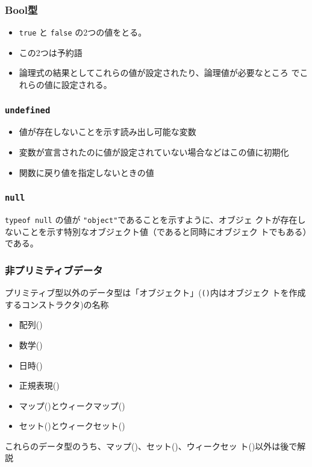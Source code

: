 \begin{frame}[containsverbatim]
 \frametitle{Bool型}
 \begin{itemize}
  \item \Verb+true+ と \Verb+false+ の2つの値をとる。
  \item この2つは予約語
  \item 論理式の結果としてこれらの値が設定されたり、論理値が必要なところ
        でこれらの値に設定される。
 \end{itemize}
\end{frame}
\begin{frame}[containsverbatim]
 \frametitle{\texttt{undefined}}
 \begin{itemize}
  \item 値が存在しないことを示す読み出し可能な変数
  \item 変数が宣言されたのに値が設定されていない場合などはこの値に初期化
  \item 関数に戻り値を指定しないときの値
 \end{itemize}
\end{frame}
\begin{frame}[containsverbatim]
 \frametitle{\texttt{null}}
\Verb+typeof null+ の値が \Verb+"object"+であることを示すように、オブジェ
クトが存在しないことを示す特別なオブジェクト値（であると同時にオブジェク
トでもある）である。
\end{frame}
\begin{frame}[containsverbatim]
\frametitle{非プリミティブデータ}
プリミティブ型以外のデータ型は「オブジェクト」(\texttt{()}内はオブジェク
トを作成するコンストラクタ)の名称
\begin{itemize}
 \item 配列()
 \item 数学()
 \item 日時()
 \item 正規表現()
 \item マップ()とウィークマップ()
 \item セット()とウィークセット()
\end{itemize}
 これらのデータ型のうち、マップ()、セット()、ウィークセッ
 ト()以外は後で解説
\end{frame}
